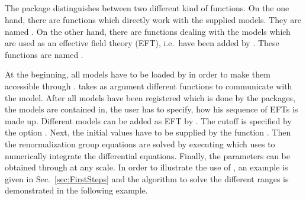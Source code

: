 \documentclass[10pt,a4paper,twoside]{scrartcl}
\begin{document}


\subsection[\package{RGESolver}]{}

The package distinguishes between two different kind of functions. On the one
hand, there are functions which directly work with the supplied models. They are
named . On the other hand, there are functions dealing
with the models which are used as an effective field theory (EFT), i.e.\ have been added by
. These functions are named .

At the beginning, all models have to be loaded by
 in order to make them accessible through
.  takes as argument
different functions to communicate with the model. After all models have been
registered which is done by the packages, the models are contained in, the user
has to specify, how his sequence of EFTs is made up. Different models can be
added as EFT by . The cutoff is specified by the option
. Next, the initial values have to be supplied by the function 
. Then the renormalization group equations are solved
by executing  which uses  to numerically
integrate the differential equations. Finally, the parameters can be obtained
through  at any scale. In order to illustrate the use
of , an example is given in Sec.~\ref{sec:FirstSteps} and the
algorithm to solve the different ranges is demonstrated in the following example.
\end{document}
